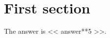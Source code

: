 \documentclass{article}
\begin{document}
\section{First section}

The answer is << answer**5 >>.
\end{document}
